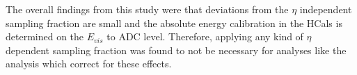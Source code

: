 The overall findings from this study were that deviations from the $\eta$ independent sampling fraction are small and the absolute energy calibration in the HCals is determined on the $E_{vis}$ to ADC level. 
Therefore, applying any kind of $\eta$ dependent sampling fraction was found to not be necessary for analyses like the \detdeta analysis which correct for these effects.

